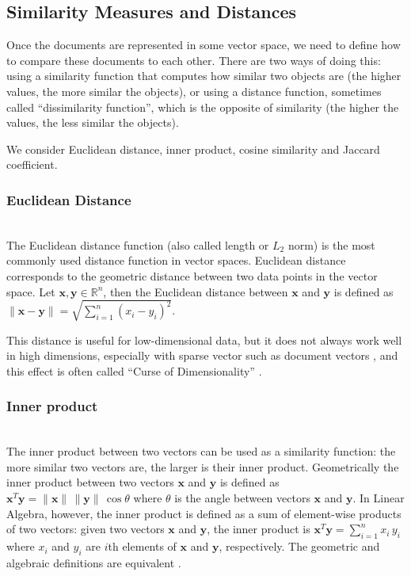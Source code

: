 \subsection{Similarity Measures and Distances} \label{sec:similarity-distance}

Once the documents are represented in some vector space, we need to
define how to compare these documents to each other. There are two
ways of doing this: using a similarity function that computes how similar
two objects are (the higher values, the more similar the objects),
or using a distance function, sometimes called ``dissimilarity function'',
which is the opposite of similarity (the higher the values, the less similar
the objects).

We consider Euclidean distance, inner product, cosine similarity and
Jaccard coefficient.


\subsubsection{Euclidean Distance} \ \\

The Euclidean distance function (also called length or $L_2$ norm) 
is the most commonly used distance function in vector spaces. 
Euclidean distance corresponds to the geometric distance between two data 
points in the vector space. Let $\mathbf x, \mathbf y \in \mathbb R^n$, then 
the Euclidean distance between $\mathbf x$ and $\mathbf y$ is defined 
as $\| \mathbf x - \mathbf y \| = \sqrt{\sum_{i = 1}^n (x_i - y_i)^2}$.


This distance is useful for low-dimensional data, but it does not always work
well in high dimensions, especially with sparse vector such as
document vectors \cite{ertoz2003finding}, and this effect is often called 
``Curse of Dimensionality'' \cite{beyer1999nearest}.


\subsubsection{Inner product} \ \\

The inner product between two vectors can be used as a similarity function:
the more similar two vectors are, the larger is their inner product.
Geometrically the inner product between two vectors $\mathbf x$ and $\mathbf y$
is defined as
$\mathbf x^T \mathbf y = \|\mathbf x \| \, \| \mathbf y \| \, \cos \theta$
where $\theta$ is the angle between vectors $\mathbf x$ and $\mathbf y$.
In Linear Algebra, however, the inner product
is defined as a sum of element-wise products of two vectors:
given two vectors $\mathbf x$ and $\mathbf y$, the inner product is
$\mathbf x^T \mathbf y = \sum_{i = 1}^n x_i \, y_i$ where $x_i$ and $y_i$
are $i$th elements of $\mathbf x$ and $\mathbf y$, respectively.
The geometric and algebraic definitions are equivalent \cite{huges2013calculus}.



